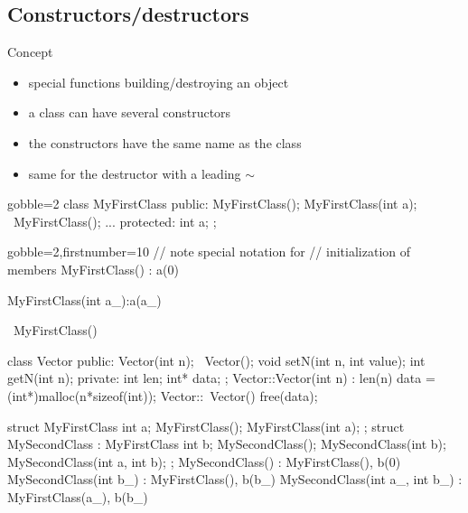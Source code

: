 \subsection[construct]{Constructors/destructors}

\begin{frame}[fragile]
  \begin{block}{Concept}
    \begin{itemize}
    \item special functions building/destroying an object
    \item a class can have several constructors
    \item the constructors have the same name as the class
    \item same for the destructor with a leading $\sim$
    \end{itemize}
  \end{block}
  \begin{multicols}{2}
    \begin{cppcode*}{gobble=2}
      class MyFirstClass {
      public:
        MyFirstClass();
        MyFirstClass(int a);
        ~MyFirstClass();
        ...
      protected:
        int a;
      };
    \end{cppcode*}
    \columnbreak
    \begin{cppcode*}{gobble=2,firstnumber=10}
      // note special notation for
      // initialization of members
      MyFirstClass() : a(0) {}

      MyFirstClass(int a_):a(a_) {}

      ~MyFirstClass() {}
    \end{cppcode*}
  \end{multicols}
\end{frame}


\begin{frame}[fragile]
  \begin{cppcode}
    class Vector {
    public:
      Vector(int n);
      ~Vector();
      void setN(int n, int value);
      int getN(int n);
    private:
      int len;
      int* data;
    };
    Vector::Vector(int n) : len(n) {
      data = (int*)malloc(n*sizeof(int));
    }
    Vector::~Vector() {
      free(data);
    }
  \end{cppcode}
\end{frame}

\begin{frame}[fragile]
  \begin{cppcode}
    struct MyFirstClass {
      int a;
      MyFirstClass();
      MyFirstClass(int a);
    };
    struct MySecondClass : MyFirstClass {
      int b;
      MySecondClass();
      MySecondClass(int b);
      MySecondClass(int a, int b);
    };
    MySecondClass() : MyFirstClass(), b(0) {}
    MySecondClass(int b_) : MyFirstClass(), b(b_) {}
    MySecondClass(int a_,
                  int b_) : MyFirstClass(a_), b(b_) {}
  \end{cppcode}
\end{frame}

